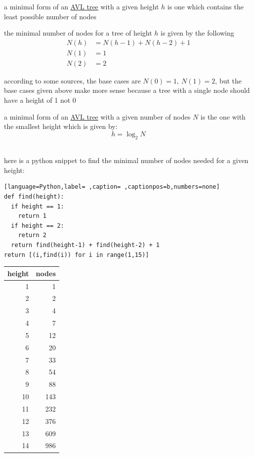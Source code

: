 \documentclass[a4paper,12pt]{article}
\begin{document}
\begin{definition}
a minimal form of an \hyperref[sec:orge9da911]{AVL tree} with a given height \(h\) is one which contains the least possible number of nodes\\[0pt]
\begin{lemma}
the minimal number of nodes for a tree of height \(h\) is given by the following \\[0pt]
\begin{align*}
  N(h)&=N(h-1) + N(h-2) + 1\\
  N(1)&=1\\
  N(2)&=2
\end{align*}
\begin{note}
according to some sources, the base cases are \(N(0)=1,\ N(1)=2\), but the base cases given above make more sense because a tree with a single node should have a height of 1 not 0\\[0pt]
\end{note}
\end{lemma}

\begin{lemma}
a minimal form of an \hyperref[sec:orge9da911]{AVL tree} with a given number of nodes \(N\) is the one with the smallest height which is given by:\\[0pt]
\[
  h = \log_2 N
\]\\[0pt]
\end{lemma}
here is a python snippet to find the minimal number of nodes needed for a given height:\\[0pt]

\begin{lstlisting}[language=Python,label= ,caption= ,captionpos=b,numbers=none]
def find(height):
  if height == 1:
    return 1
  if height == 2:
    return 2
  return find(height-1) + find(height-2) + 1
return [(i,find(i)) for i in range(1,15)]
\end{lstlisting}

\begin{center}
\begin{tabular}{rr}
height & nodes\\[0pt]
\hline
1 & 1\\[0pt]
2 & 2\\[0pt]
3 & 4\\[0pt]
4 & 7\\[0pt]
5 & 12\\[0pt]
6 & 20\\[0pt]
7 & 33\\[0pt]
8 & 54\\[0pt]
9 & 88\\[0pt]
10 & 143\\[0pt]
11 & 232\\[0pt]
12 & 376\\[0pt]
13 & 609\\[0pt]
14 & 986\\[0pt]
\end{tabular}
\end{center}
\end{definition}
\end{document}
